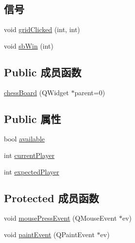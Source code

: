 \subsection*{信号}
\begin{DoxyCompactItemize}
\item 
void \hyperlink{classchess_board_ad33413fdd05cdedc6f63b56c3d0d5ced_ad33413fdd05cdedc6f63b56c3d0d5ced}{grid\+Clicked} (int, int)
\item 
void \hyperlink{classchess_board_ab05811b7fea74301f9169fe5e4e9b96f_ab05811b7fea74301f9169fe5e4e9b96f}{sb\+Win} (int)
\end{DoxyCompactItemize}
\subsection*{Public 成员函数}
\begin{DoxyCompactItemize}
\item 
\hyperlink{classchess_board_a3ffc09a4d95deaca0f6744ae25bb4f62_a3ffc09a4d95deaca0f6744ae25bb4f62}{chess\+Board} (Q\+Widget $\ast$parent=0)
\end{DoxyCompactItemize}
\subsection*{Public 属性}
\begin{DoxyCompactItemize}
\item 
bool \hyperlink{classchess_board_a7725e13857e6ddc2b155a9876ed4dea2_a7725e13857e6ddc2b155a9876ed4dea2}{available}
\item 
int \hyperlink{classchess_board_aedf4d34b20da347daf67987a1894062c_aedf4d34b20da347daf67987a1894062c}{current\+Player}
\item 
int \hyperlink{classchess_board_ade0d99898f63b66db3fa79d06c9bc350_ade0d99898f63b66db3fa79d06c9bc350}{expected\+Player}
\end{DoxyCompactItemize}
\subsection*{Protected 成员函数}
\begin{DoxyCompactItemize}
\item 
void \hyperlink{classchess_board_a234e4616abf11faa8dbc761eb21a6da7_a234e4616abf11faa8dbc761eb21a6da7}{mouse\+Press\+Event} (Q\+Mouse\+Event $\ast$ev)
\item 
void \hyperlink{classchess_board_aa7f58165ccd9b233e091e79b60c4bf38_aa7f58165ccd9b233e091e79b60c4bf38}{paint\+Event} (Q\+Paint\+Event $\ast$ev)
\end{DoxyCompactItemize}
